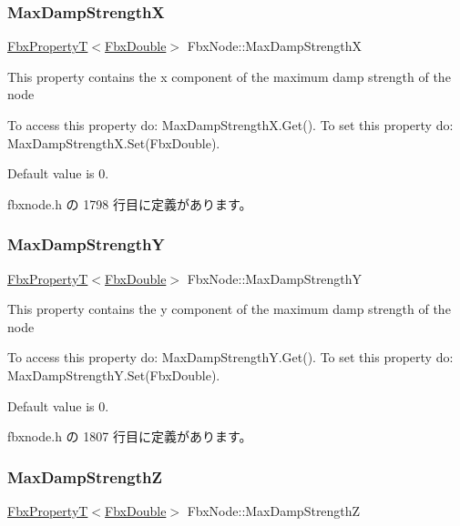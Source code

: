 \subsubsection{\texorpdfstring{Max\+Damp\+StrengthX}{MaxDampStrengthX}}
{\footnotesize\ttfamily \hyperlink{class_fbx_property_t}{Fbx\+PropertyT}$<$\hyperlink{fbxtypes_8h_a171e72a1c46fc15c1a6c9c31948c1c5b}{Fbx\+Double}$>$ Fbx\+Node\+::\+Max\+Damp\+StrengthX}

This property contains the x component of the maximum damp strength of the node

To access this property do\+: Max\+Damp\+Strength\+X.\+Get(). To set this property do\+: Max\+Damp\+Strength\+X.\+Set(\+Fbx\+Double).

Default value is 0. 

 fbxnode.\+h の 1798 行目に定義があります。

\mbox{\label{class_fbx_node_af62a8865505138ce889586f13535bc0e}} 
\subsubsection{\texorpdfstring{Max\+Damp\+StrengthY}{MaxDampStrengthY}}
{\footnotesize\ttfamily \hyperlink{class_fbx_property_t}{Fbx\+PropertyT}$<$\hyperlink{fbxtypes_8h_a171e72a1c46fc15c1a6c9c31948c1c5b}{Fbx\+Double}$>$ Fbx\+Node\+::\+Max\+Damp\+StrengthY}

This property contains the y component of the maximum damp strength of the node

To access this property do\+: Max\+Damp\+Strength\+Y.\+Get(). To set this property do\+: Max\+Damp\+Strength\+Y.\+Set(\+Fbx\+Double).

Default value is 0. 

 fbxnode.\+h の 1807 行目に定義があります。

\mbox{\label{class_fbx_node_a560c4e2acb691a960b607f9381b26681}} 
\subsubsection{\texorpdfstring{Max\+Damp\+StrengthZ}{MaxDampStrengthZ}}
{\footnotesize\ttfamily \hyperlink{class_fbx_property_t}{Fbx\+PropertyT}$<$\hyperlink{fbxtypes_8h_a171e72a1c46fc15c1a6c9c31948c1c5b}{Fbx\+Double}$>$ Fbx\+Node\+::\+Max\+Damp\+StrengthZ}

